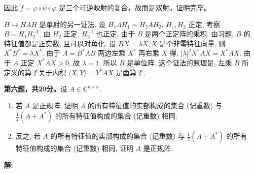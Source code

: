 \begin{enumerate}
因此 \(f = \varphi \circ \psi \circ \varphi\)
是三个可逆映射的复合，故而是双射。证明完毕。

\(H \mapsto HAH\) 是单射的另一证法. 设
\(H_{1}AH_{1} = H_{2}AH_{2}\), \(H_{1}, H_{2}\) 正定, 考察
\(B = H_{1}H_{2}^{-1}\). 由 \(H_{2}\) 正定, \(H_{2}^{-1}\) 也正定. 
由于 \(B\) 是两个正定阵的乘积, 由习题, \(B\) 的特征值都是正实数,
且可以对角化. 设 \(BX = \lambda X, X\) 是个非零特征向量, 则
\(X^{*}B^{*} = \bar{\lambda}X^{*}\). 由于 \(A = B^{*}AB\) 两边左乘
\(X^{*}\) 再右乘 \(X\) 得, \(|\lambda|^{2}X^{*}AX = X^{*}AX\). 由于
\(A\) 正定 \(X^{*}AX > 0\), 故 \(\lambda = 1\). 所以 \(B\) 是单位阵.
这个证法的原理是, 左乘 \(B\) 所定义的算子关于内积
\(\langle X, Y \rangle = Y^{*}AX\) 是酉算子.
\end{enumerate}

\textbf{第六题，共20分。}设 \(A \in \mathbb{C}^{n \times n}\).

\begin{enumerate}
\def\labelenumi{\arabic{enumi}.}
\item
  若 $A$ 是正规阵, 证明 $A$ 的所有特征值的实部构成的集合 (记重数) 
  与 \(\frac{1}{2}(A + A^{*})\) 的所有特征值构成的集合 (记重数) 相同.
\item
  反之, 若 $A$ 的所有特征值的实部构成的集合 (记重数) 
  与 \(\frac{1}{2}(A+A^{*})\) 的所有特征值构成的集合 (记重数) 相同, 
  证明 $A$ 是正规阵.
\end{enumerate}

\textbf{解:}

